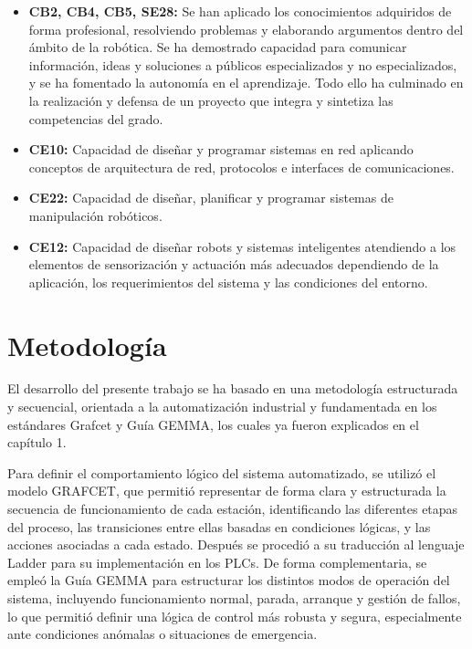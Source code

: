 \begin{itemize}
	\item \textbf{CB2, CB4, CB5, SE28:} Se han aplicado los conocimientos adquiridos de forma profesional, resolviendo problemas y elaborando argumentos dentro del ámbito de la robótica. Se ha demostrado capacidad para comunicar información, ideas y soluciones a públicos especializados y no especializados, y se ha fomentado la autonomía en el aprendizaje. Todo ello ha culminado en la realización y defensa de un proyecto que integra y sintetiza las competencias del grado.

	\item \textbf{CE10:} Capacidad de diseñar y programar sistemas en red aplicando conceptos de arquitectura de red, protocolos e interfaces de comunicaciones.

	\item \textbf{CE22:} Capacidad de diseñar, planificar y programar sistemas de manipulación robóticos.

	\item \textbf{CE12:} Capacidad de diseñar robots y sistemas inteligentes atendiendo a los elementos de sensorización y actuación más adecuados dependiendo de la aplicación, los requerimientos del sistema y las condiciones del entorno.

\end{itemize}
 
\section{Metodología}
\label{sec:metodologia}

El desarrollo del presente trabajo se ha basado en una metodología estructurada y secuencial, orientada a la automatización industrial y fundamentada en los estándares Grafcet y Guía GEMMA, los cuales ya fueron explicados en el capítulo 1.

Para definir el comportamiento lógico del sistema automatizado, se utilizó el modelo GRAFCET, que permitió representar de forma clara y estructurada la secuencia de funcionamiento de cada estación, identificando las diferentes etapas del proceso, las transiciones entre ellas basadas en condiciones lógicas, y las acciones asociadas a cada estado. Después se procedió a su traducción al lenguaje Ladder para su implementación en los PLCs. De forma complementaria, se empleó la Guía GEMMA para estructurar los distintos modos de operación del sistema, incluyendo funcionamiento normal, parada, arranque y gestión de fallos, lo que permitió definir una lógica de control más robusta y segura, especialmente ante condiciones anómalas o situaciones de emergencia.

